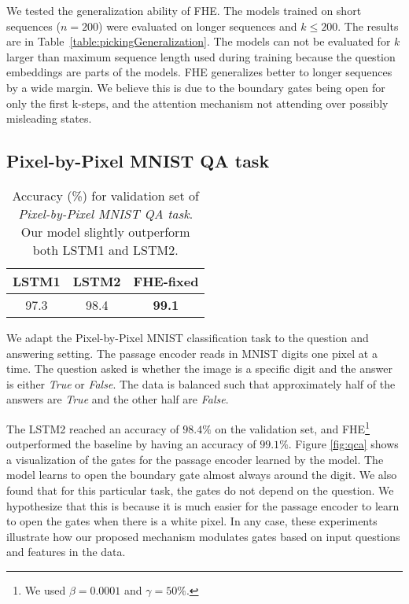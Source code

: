 We tested the generalization ability of FHE. The models trained on short sequences (\mbox{$n=200$}) were evaluated on longer sequences and \mbox{$k\leq200$}. The results are in Table~\ref{table:pickingGeneralization}. The models can not be evaluated for $k$ larger than maximum sequence length used during training because the question embeddings are parts of the models. FHE generalizes better to longer sequences by a wide margin. We believe this is due to the boundary gates being open for only the first k-steps, and the attention mechanism not attending over possibly misleading states.

\subsection{Pixel-by-Pixel MNIST QA task}

\begin{table}[t!]
\vskip -0.1in
\caption{Accuracy (\%) for validation set of \emph{Pixel-by-Pixel MNIST QA task}. Our model slightly outperform both LSTM1 and LSTM2.}
\label{table:mnist}
\vskip 0.1in
\begin{center}
\begin{small}
\begin{sc}
\begin{tabular}{c c | c}
 \toprule
 \textbf{LSTM1} &  \textbf{LSTM2} & \textbf{FHE-fixed}\\
 \midrule
 97.3 & 98.4 &  \textbf{99.1}\\
 \bottomrule
\end{tabular}
\end{sc}
\end{small}
\end{center}
\vskip -0.25in
\end{table}

We adapt the Pixel-by-Pixel MNIST classification task \cite{lecun1998gradient,DBLP:journals/corr/LeJH15} to the question and answering setting. The passage encoder reads in MNIST digits one pixel at a time. The question asked is whether the image is a specific digit and the answer is either \emph{True} or \emph{False}. The data is balanced such that approximately half of the answers are \emph{True} and the other half are \emph{False}.

The LSTM2 reached an accuracy of $98.4\%$ on the validation set, and FHE\footnote{We used $\beta=0.0001$ and $\gamma=50\%$.} outperformed the baseline by having an accuracy of $99.1\%$. Figure \ref{fig:qca} shows a visualization of the gates for the passage encoder learned by the model. The model learns to open the boundary gate almost always around the digit. We also found that for this particular task, the gates do not depend on the question. We hypothesize that this is because it is much easier for the passage encoder to learn to open the gates when there is a white pixel. In any case, these experiments illustrate how our proposed mechanism  modulates gates based on input questions and features in the data.